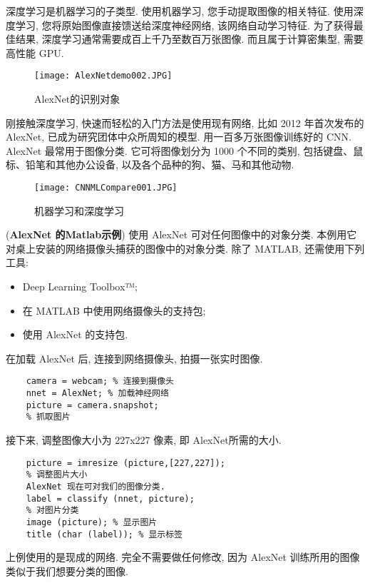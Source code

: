 深度学习是机器学习的子类型. 使用机器学习, 您手动提取图像的相关特征. 使用深度学习, 您将原始图像直接馈送给深度神经网络, 该网络自动学习特征.
为了获得最佳结果, 深度学习通常需要成百上千乃至数百万张图像. 而且属于计算密集型, 需要高性能 GPU.
\begin{figure}[H]
\centering
\texttt{[image: AlexNetdemo002.JPG]}
\caption{AlexNet的识别对象}
\label{AlexNetdemo002}
\vspace{-0.4cm}
\end{figure}
刚接触深度学习, 快速而轻松的入门方法是使用现有网络, 比如 2012 年首次发布的AlexNet, 已成为研究团体中众所周知的模型.
用一百多万张图像训练好的 CNN.
AlexNet 最常用于图像分类. 它可将图像划分为 1000 个不同的类别, 包括键盘、鼠标、铅笔和其他办公设备, 以及各个品种的狗、猫、马和其他动物.
\begin{figure}[H]
    \centering
    \texttt{[image: CNNMLCompare001.JPG]}
    \caption{机器学习和深度学习}
    \label{CNNMLCompare001}
    \vspace{-0.4cm}
\end{figure}
\begin{example}
 (\textbf{AlexNet 的Matlab示例}) 使用 AlexNet 可对任何图像中的对象分类. 本例用它对桌上安装的网络摄像头捕获的图像中的对象分类.
 除了 MATLAB, 还需使用下列工具:
\begin{itemize}
\item Deep Learning Toolbox™;
\item 在 MATLAB 中使用网络摄像头的支持包;
\item 使用 AlexNet 的支持包.
\end{itemize}
在加载 AlexNet 后, 连接到网络摄像头,  拍摄一张实时图像.
\begin{Verbatim}
    camera = webcam; % 连接到摄像头
    nnet = AlexNet; % 加载神经网络
    picture = camera.snapshot;
    % 抓取图片
\end{Verbatim}
接下来, 调整图像大小为 227x227 像素, 即 AlexNet所需的大小.
\begin{Verbatim}
    picture = imresize (picture,[227,227]);
    % 调整图片大小
    AlexNet 现在可对我们的图像分类.
    label = classify (nnet, picture);
    % 对图片分类
    image (picture); % 显示图片
    title (char (label)); % 显示标签
\end{Verbatim}
\vspace{-0.3cm}
\end{example}
上例使用的是现成的网络. 完全不需要做任何修改, 因为 AlexNet 训练所用的图像类似于我们想要分类的图像.

